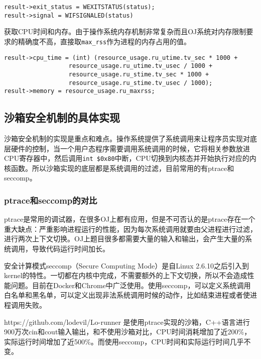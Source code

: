 \begin{verbatim}
result->exit_status = WEXITSTATUS(status);
result->signal = WIFSIGNALED(status)
\end{verbatim}

获取CPU时间和内存。由于操作系统内存机制非常复杂而且OJ系统对内存限制要求的精确度不高，直接取\texttt{max\_rss}作为进程的内存占用的值。

\begin{verbatim}
result->cpu_time = (int) (resource_usage.ru_utime.tv_sec * 1000 + 
                  resource_usage.ru_utime.tv_usec / 1000 + 
                  resource_usage.ru_stime.tv_sec * 1000 + 
                  resource_usage.ru_stime.tv_usec / 1000);
result->memory = resource_usage.ru_maxrss;
\end{verbatim}

\subsection{沙箱安全机制的具体实现}

沙箱安全机制的实现是重点和难点。操作系统提供了系统调用来让程序员实现对底层硬件的控制，当一个用户态程序需要调用系统调用的时候，它将相关参数放进CPU寄存器中，然后调用\texttt{int \$0x80}中断，CPU切换到内核态并开始执行对应的内核函数。所以沙箱实现的底层都是系统调用的过滤，目前常用的有ptrace和seccomp\cite{sandbox-for-non-root-users,sandbox-comparison-for-oj,new-contest-sandbox,sandbox-for-linux}。

\subsubsection{ptrace和seccomp的对比}

ptrace是常用的调试器\cite{ptrace}，在很多OJ上都有应用，但是不可否认的是ptrace存在一个重大缺点：严重影响进程运行的性能\cite{ptrace-performance}，因为每次系统调用就要由父进程进行过滤，进行两次上下文切换。OJ上题目很多都需要大量的输入和输出，会产生大量的系统调用，导致代码运行时间加长。

安全计算模式seccomp（Secure Computing Mode）是自Linux 2.6.10之后引入到kernel的特性。\cite{seccomp}一切都在内核中完成，不需要额外的上下文切换，所以不会造成性能问题。目前在Docker和Chrome中广泛使用。使用seccomp，可以定义系统调用白名单和黑名单，可以定义出现非法系统调用时候的动作，比如结束进程或者使进程调用失败。

https://github.com/lodevil/Lo-runner 是使用ptrace实现的沙箱，C++语言进行900万次cin和cout输入输出，和不使用沙箱对比，CPU时间消耗增加了近200\%，实际运行时间增加了近500\%。而使用seccomp，CPU时间和实际运行时间几乎不变。%


